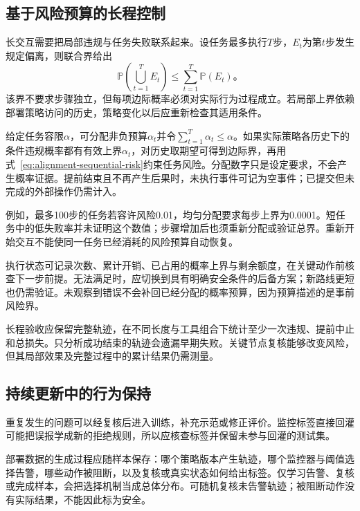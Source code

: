 \subsection{基于风险预算的长程控制}
\label{sec:alignment-generalization-horizon}

长交互需要把局部违规与任务失败联系起来。设任务最多执行$T$步，$E_t$为第$t$步发生规定偏离，则联合界给出
\begin{equation}
 \mathbb P\left(\bigcup_{t=1}^{T}E_t\right)
 \leq\sum_{t=1}^{T}\mathbb P(E_t)\text{。}
 \label{eq:alignment-sequential-risk}
\end{equation}
该界不要求步骤独立，但每项边际概率必须对实际行为过程成立。若局部上界依赖部署策略访问的历史，策略变化以后应重新检查其适用条件。

给定任务容限$\alpha$，可分配非负预算$\alpha_t$并令$\sum_{t=1}^{T}\alpha_t\leq\alpha$。如果实际策略各历史下的条件违规概率都有有效上界$\alpha_t$，对历史取期望可得到边际界，再用式~\eqref{eq:alignment-sequential-risk}约束任务风险。分配数字只是设定要求，不会产生概率证据。提前结束且不再产生后果时，未执行事件可记为空事件；已提交但未完成的外部操作仍需计入。

例如，最多100步的任务若容许风险0.01，均匀分配要求每步上界为0.0001。短任务中的低失败率并未证明这个数值；步骤增加后也须重新分配或验证总界。重新开始交互不能使同一任务已经消耗的风险预算自动恢复。

执行状态可记录次数、累计开销、已占用的概率上界与剩余额度，在关键动作前核查下一步前提。无法满足时，应切换到具有明确安全条件的后备方案；新路线更短也仍需验证。未观察到错误不会补回已经分配的概率预算，因为预算描述的是事前风险界。

长程验收应保留完整轨迹，在不同长度与工具组合下统计至少一次违规、提前中止和总损失。只分析成功结束的轨迹会遗漏早期失败。关键节点复核能够改变风险，但其局部效果及完整过程中的累计结果仍需测量。

\subsection{持续更新中的行为保持}
\label{sec:alignment-generalization-update}

重复发生的问题可以经复核后进入训练，补充示范或修正评价。监控标签直接回灌可能把误报学成新的拒绝规则，所以应核查标签并保留未参与回灌的测试集。

部署数据的生成过程应随样本保存：哪个策略版本产生轨迹，哪个监控器与阈值选择告警，哪些动作被阻断，以及复核或真实状态如何给出标签。仅学习告警、复核或完成样本，会把选择机制当成总体分布。可随机复核未告警轨迹；被阻断动作没有实际结果，不能因此标为安全。

